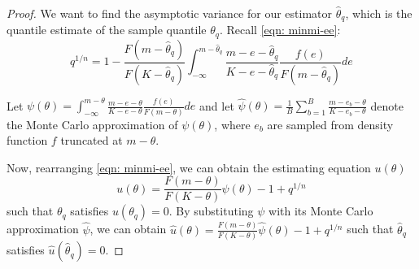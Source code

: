 \ChooseMinmiB*

\begin{proof}
    We want to find the asymptotic variance for our estimator $\hat\theta_q$, which is the quantile estimate of the sample quantile $\theta_q$. Recall \autoref{eqn: minmi-ee}: \[ q^{1/n} = 1 - \frac{F(m-\hat\theta_q)}{F(K-\hat\theta_q)} \int^{m-\hat\theta_q}_{-\infty} \frac{m-e-\hat\theta_q}{K-e-\hat\theta_q} \frac{f(e)}{F(m-\hat\theta_q)} de \]
    
    Let $\psi(\theta) = \int^{m-\theta}_{-\infty} \frac{m-e-\theta}{K-e-\theta} \frac{f(e)}{F(m-\theta)} de$ and let $\hat\psi(\theta) = \frac{1}{B} \sum_{b=1}^B \frac{m-e_b-\theta}{K-e_b-\theta}$ denote the Monte Carlo approximation of $\psi(\theta)$, where $e_b$ are sampled from density function $f$ truncated at $m-\theta$.
    
    Now, rearranging \autoref{eqn: minmi-ee}, we can obtain the estimating equation $u(\theta)$ \begin{equation}\label{eqn: minmi-ee-u(theta)}
        u(\theta) = \frac{F(m-\theta)}{F(K-\theta)} \psi(\theta) - 1 + q^{1/n}
    \end{equation} such that $\theta_q$ satisfies $u(\theta_q) = 0$. By substituting $\psi$ with its Monte Carlo approximation $\hat\psi$, we can obtain $\hat{u}(\theta) = \frac{F(m-\theta)}{F(K-\theta)} \hat{\psi}(\theta) - 1 + q^{1/n}$ such that $\hat\theta_q$ satisfies $\hat{u}(\hat\theta_q) = 0$.
    

\end{proof}
